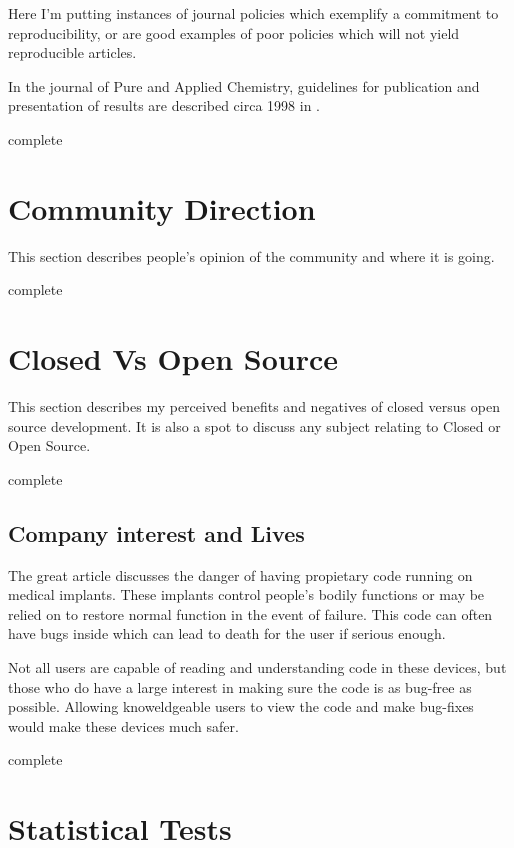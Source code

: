 \documentclass[american]{article}
\newcommand{\complete}{
	\gls{complete}
}
\begin{document}
Here I'm putting instances of journal policies which exemplify a commitment to reproducibility, or are good examples of poor policies which will not yield reproducible articles.

In the journal of Pure and Applied Chemistry, guidelines for publication and presentation of results are described circa 1998 in \cite{pac-guidelines-publication-1998,pac-guidelines-presentation-1998}.

\complete

\section{Community Direction} \label{sec:community}

This section describes people's opinion of the community and where it is going.

\complete

\section{Closed Vs Open Source} \label{sec:closed-v-open}

This section describes my perceived benefits and negatives of closed versus open source development. It is also a spot to discuss any subject relating to Closed or Open Source.

\complete

\subsection{Company interest and Lives} \label{sec:closed-v-open-company}

The great article \cite{killed-by-code} discusses the danger of having propietary code running on medical implants. These implants control people's bodily functions or may be relied on to restore normal function in the event of failure. This code can often have bugs inside which can lead to death for the user if serious enough.

Not all users are capable of reading and understanding code in these devices, but those who do have a large interest in making sure the code is as bug-free as possible. Allowing knoweldgeable users to view the code and make bug-fixes would make these devices much safer.

\complete

\section{Statistical Tests} \label{sec:statistical}
\end{document}

